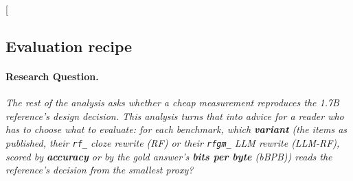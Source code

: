 \clearpage
\twocolumn[{%
\subsection{Evaluation recipe}
\label{app:rq11_evaluation_recipe}

\noindent\begin{minipage}[t]{0.485\textwidth}
\vspace{0pt}
\paragraph{Research Question.} \emph{The rest of the analysis asks whether a cheap measurement reproduces the 1.7B reference's design decision. This analysis turns that into advice for a reader who has to choose what to evaluate: for each benchmark, which \textbf{variant} (the items as published, their \texttt{rf\_} cloze rewrite (RF) or their \texttt{rfgm\_} LLM rewrite (LLM-RF), scored by \textbf{accuracy} or by the gold answer's \textbf{bits per byte} (bBPB)) reads the reference's decision from the smallest proxy?}


\end{minipage}}
